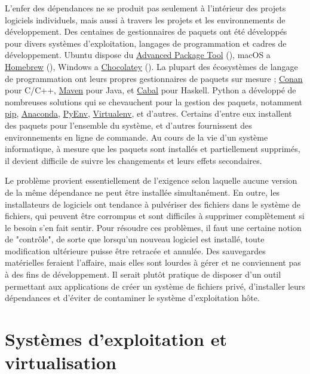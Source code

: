 L'enfer des dépendances ne se produit pas seulement à l'intérieur des projets logiciels individuels, mais aussi à travers les projets et les environnements de développement. Des centaines de gestionnaires de paquets ont été développés pour divers systèmes d'exploitation, langages de programmation et cadres de développement. Ubuntu dispose du \href{https://help.ubuntu.com/lts/serverguide/apt.html}{Advanced Package Tool} (), macOS a \href{https://brew.sh/}{Homebrew} (), Windows a \href{https://chocolatey.org/}{Chocolatey} (). La plupart des écosystèmes de langage de programmation ont leurs propres gestionnaires de paquets sur mesure ; \href{https://conan.io/}{Conan} pour C/C++, \href{https://maven.apache.org}{Maven} pour Java, et \href{https://www.haskell.org/cabal/}{Cabal} pour Haskell. Python a développé de nombreuses solutions qui se chevauchent pour la gestion des paquets, notamment \href{https://pypi.org/project/pip/}{pip}, \href{https://www.anaconda.com/}{Anaconda}, \href{https://github.com/pyenv/pyenv}{PyEnv}, \href{https://virtualenv.pypa.io/}{Virtualenv}, et d'autres. Certains d'entre eux installent des paquets pour l'ensemble du système, et d'autres fournissent des environnements en ligne de commande. Au cours de la vie d'un système informatique, à mesure que les paquets sont installés et partiellement supprimés, il devient difficile de suivre les changements et leurs effets secondaires.

Le problème provient essentiellement de l'exigence selon laquelle aucune version de la même dépendance ne peut être installée simultanément. En outre, les installateurs de logiciels ont tendance à pulvériser des fichiers dans le système de fichiers, qui peuvent être corrompus et sont difficiles à supprimer complètement si le besoin s'en fait sentir. Pour résoudre ces problèmes, il faut une certaine notion de "contrôle", de sorte que lorsqu'un nouveau logiciel est installé, toute modification ultérieure puisse être retracée et annulée. Des sauvegardes matérielles feraient l'affaire, mais elles sont lourdes à gérer et ne conviennent pas à des fins de développement. Il serait plutôt pratique de disposer d'un outil permettant aux applications de créer un système de fichiers privé, d'installer leurs dépendances et d'éviter de contaminer le système d'exploitation hôte.

\section{Systèmes d'exploitation et virtualisation}\label{sec:os-and-virtualization}

